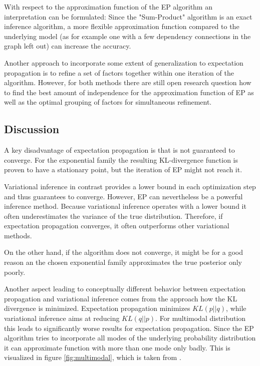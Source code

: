 \documentclass{sigkdd}
\begin{document}
With respect to the approximation function of the EP algorithm an interpretation can be formulated: Since the "Sum-Product" algorithm is an exact inference algorithm, a more flexible approximation function compared to the underlying model (as for example one with a few dependency connections in the graph left out) can increase the accuracy.

Another approach to incorporate some extent of generalization to expectation propagation is to refine a set of factors together within one iteration of the algorithm. However, for both methods there are still open research question how to find the best amount of independence for the approximation function of EP as well as the optimal grouping of factors for simultaneous refinement.

\subsection{Discussion}
A key disadvantage of expectation propagation is that is not guaranteed to converge. For the exponential family the resulting KL-divergence function is proven to have a stationary point, but the iteration of EP might not reach it.

Variational inference in contrast provides a lower bound in each optimization step and thus guarantees to converge. However, EP can nevertheless be a powerful inference method. Because variational inference operates with a lower bound it often underestimates the variance of the true distribution. Therefore, if expectation propagation converges, it often outperforms other variational methods.

On the other hand, if the algorithm does not converge, it might be for a good reason an the chosen exponential family approximates the true posterior only poorly.

Another aspect leading to conceptually different behavior between expectation propagation and variational inference comes from the approach how the KL divergence is minimized. Expectation propagation minimizes $KL(p||q)$, while variational inference aims at reducing $KL(q||p)$. For multimodal distribution this leads to significantly worse results for expectation propagation. Since the EP algorithm tries to incorporate all modes of the underlying probability distribution it can approximate function with more than one mode only badly. This is visualized in figure \ref{fig:multimodal}, which is taken from \cite{bishop2006prml}.
\end{document}
